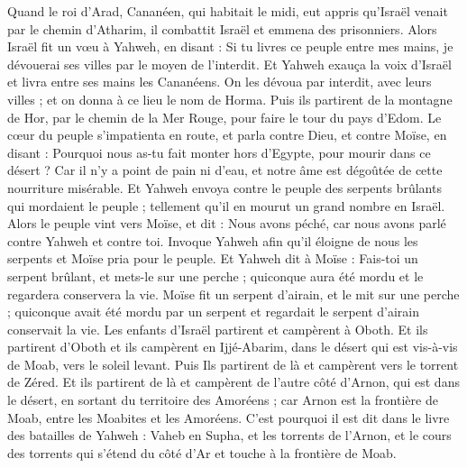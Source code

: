 \begin{multicols}{2}
\VerseOne{}Quand le roi d'Arad, Cananéen, qui habitait le midi, eut appris qu'Israël venait par le chemin d'Atharim, il combattit Israël et emmena des prisonniers.
Alors Israël fit un vœu à Yahweh, en disant : Si tu livres ce peuple entre mes mains, je dévouerai ses villes par le moyen de l'interdit.
Et Yahweh exauça la voix d'Israël et livra entre ses mains les Cananéens. On les dévoua par interdit, avec leurs villes ; et on donna à ce lieu le nom de Horma.
Puis ils partirent de la montagne de Hor, par le chemin de la Mer Rouge, pour faire le tour du pays d'Edom. Le cœur du peuple s'impatienta en route,
et parla contre Dieu, et contre Moïse, en disant : Pourquoi nous as-tu fait monter hors d'Egypte, pour mourir dans ce désert ? Car il n'y a point de pain ni d'eau, et notre âme est dégoûtée de cette nourriture misérable.
Et Yahweh envoya contre le peuple des serpents brûlants qui mordaient le peuple ; tellement qu'il en mourut un grand nombre en Israël.
Alors le peuple vint vers Moïse, et dit : Nous avons péché, car nous avons parlé contre Yahweh et contre toi. Invoque Yahweh afin qu'il éloigne de nous les serpents et Moïse pria pour le peuple.
Et Yahweh dit à Moïse : Fais-toi un serpent brûlant, et mets-le sur une perche ; quiconque aura été mordu et le regardera conservera la vie.
Moïse fit un serpent d'airain, et le mit sur une perche ; quiconque avait été mordu par un serpent et regardait le serpent d'airain conservait la vie.
Les enfants d'Israël partirent et campèrent à Oboth.
Et ils partirent d'Oboth et ils campèrent en Ijjé-Abarim, dans le désert qui est vis-à-vis de Moab, vers le soleil levant.
Puis Ils partirent de là et campèrent vers le torrent de Zéred.
Et ils partirent de là et campèrent de l'autre côté d'Arnon, qui est dans le désert, en sortant du territoire des Amoréens ; car Arnon est la frontière de Moab, entre les Moabites et les Amoréens.
C'est pourquoi il est dit dans le livre des batailles de Yahweh : Vaheb en Supha, et les torrents de l'Arnon,
et le cours des torrents qui s'étend du côté d'Ar et touche à la frontière de Moab.

\end{multicols}
